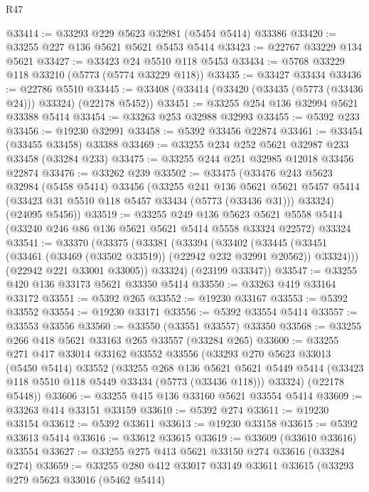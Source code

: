 \begin{lexlean}{R47}
\begin{coremodule}
@33414 := @33293 @229 @5623 @32981 (@5454 @5414) @33386
@33420 := @33255 @227 @136 @5621 @5621 @5453 @5414
@33423 := @22767 @33229 @134 @5621
@33427 := @33423 @24 @5510 @118 @5453
@33434 := @5768 @33229 @118 @33210 (@5773 (@5774 @33229 @118))
@33435 := @33427 @33434
@33436 := @22786 @5510
@33445 := @33408 (@33414 (@33420 (@33435 (@5773 (@33436 @24))) @33324) (@22178 @5452))
@33451 := @33255 @254 @136 @32994 @5621 @33388 @5414
@33454 := @33263 @253 @32988 @32993
@33455 := @5392 @233
@33456 := @19230 @32991
@33458 := @5392 @33456 @22874
@33461 := @33454 (@33455 @33458) @33388
@33469 := @33255 @234 @252 @5621 @32987 @233 @33458 (@33284 @233)
@33475 := @33255 @244 @251 @32985 @12018 @33456 @22874
@33476 := @33262 @239
@33502 := @33475
    (@33476
      @243
      @5623
      @32984
      (@5458 @5414)
      @33456
      (@33255
        @241
        @136
        @5621
        @5621
        @5457
        @5414
        (@33423 @31 @5510 @118 @5457 @33434 (@5773 (@33436 @31)))
        @33324)
      (@24095 @5456))
@33519 := @33255
    @249
    @136
    @5623
    @5621
    @5558
    @5414
    (@33240 @246 @86 @136 @5621 @5621 @5414 @5558 @33324 @22572)
    @33324
@33541 := @33370
    (@33375
      (@33381
        (@33394
          (@33402
            (@33445 (@33451 (@33461 (@33469 (@33502 @33519)) (@22942 @232 @32991 @20562)) @33324)))
          (@22942 @221 @33001 @33005))
        @33324)
      (@23199 @33347))
@33547 := @33255 @420 @136 @33173 @5621 @33350 @5414
@33550 := @33263 @419 @33164 @33172
@33551 := @5392 @265
@33552 := @19230 @33167
@33553 := @5392 @33552
@33554 := @19230 @33171
@33556 := @5392 @33554 @5414
@33557 := @33553 @33556
@33560 := @33550 (@33551 @33557) @33350
@33568 := @33255 @266 @418 @5621 @33163 @265 @33557 (@33284 @265)
@33600 := @33255
    @271
    @417
    @33014
    @33162
    @33552
    @33556
    (@33293
      @270
      @5623
      @33013
      (@5450 @5414)
      @33552
      (@33255
        @268
        @136
        @5621
        @5621
        @5449
        @5414
        (@33423 @118 @5510 @118 @5449 @33434 (@5773 (@33436 @118)))
        @33324)
      (@22178 @5448))
@33606 := @33255 @415 @136 @33160 @5621 @33554 @5414
@33609 := @33263 @414 @33151 @33159
@33610 := @5392 @274
@33611 := @19230 @33154
@33612 := @5392 @33611
@33613 := @19230 @33158
@33615 := @5392 @33613 @5414
@33616 := @33612 @33615
@33619 := @33609 (@33610 @33616) @33554
@33627 := @33255 @275 @413 @5621 @33150 @274 @33616 (@33284 @274)
@33659 := @33255
    @280
    @412
    @33017
    @33149
    @33611
    @33615
    (@33293
      @279
      @5623
      @33016
      (@5462 @5414)

\end{coremodule}
\end{lexlean}
